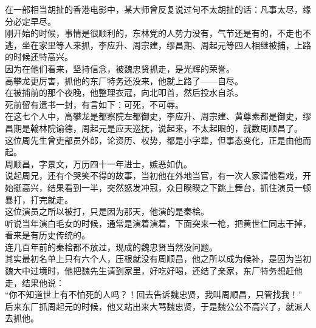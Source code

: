 \begin{multicols}{\theparacolNo}
在一部相当胡扯的香港电影中，某大师曾反复说过句不太胡扯的话：凡事太尽，缘分必定早尽。\\

刚开始的时候，事情是很顺利的，东林党的人势力没有，气节还是有的，不走也不逃，坐在家里等人来抓，李应升、周宗建，缪昌期、周起元等四人相继被捕，上路的时候还特高兴。\\

因为在他们看来，坚持信念，被魏忠贤抓走，是光辉的荣誉。\\

高攀龙更厉害，抓他的东厂特务还没来，他就上路了——自尽。\\

在被捕前的那个夜晚，他整理衣冠，向北叩首，然后投水自杀。\\

死前留有遗书一封，有言如下：可死，不可辱。\\

在这七个人中，高攀龙是都察院左都御史，李应升、周宗建、黄尊素都是御史，缪昌期是翰林院谕德，周起元是应天巡抚，说起来，不太起眼的，就数周顺昌了。\\

这位周先生曾吏部员外郎，论资历、权势，都是小字辈，但事态变化，正是由他而起。\\

周顺昌，字景文，万历四十一年进士，嫉恶如仇。\\

说起周兄，还有个哭笑不得的故事，当初他在外地当官，有一次人家请他看戏，开始挺高兴，结果看到一半，突然怒发冲冠，众目睽睽之下跳上舞台，抓住演员一顿暴打，打完就走。\\

这位演员之所以被打，只是因为那天，他演的是秦桧。\\

听说当年演白毛女的时候，通常是演着演着，下面突来一枪，把黄世仁同志干掉，看来是有历史传统的。\\

连几百年前的秦桧都不放过，现成的魏忠贤当然没问题。\\

其实最初名单上只有六个人，压根就没有周顺昌，他之所以成为候补，是因为当初魏大中过境时，他把魏先生请到家里，好吃好喝，还结了亲家，东厂特务想赶他走，结果他说：\\

“你不知道世上有不怕死的人吗？！回去告诉魏忠贤，我叫周顺昌，只管找我！”\\

后来东厂抓周起元的时候，他又站出来大骂魏忠贤，于是魏公公不高兴了，就派人去抓他。\\


\end{multicols}
